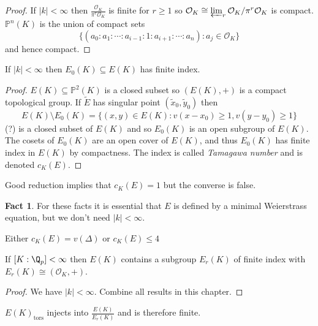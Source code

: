 \documentclass[a4paper]{article}
\theoremstyle{definition}
\newtheorem*{fact}{Fact}
\theoremstyle{theorem}
\renewcommand*{\P}{\mathbb{P}}
\renewcommand*{\O}{\mathcal{O}}
\begin{document}
\begin{proof}
  If \(|k| < \infty\) then \(\frac{\O_K}{\pi^r \O_K}\) is finite for \(r \geq 1\) so \(\O_K \cong \varprojlim_r \O_K/\pi^r \O_K\) is compact. \(\P^n(K)\) is the union of compact sets
  \[
    \{(a_0: a_1: \cdots : a_{i - 1}: 1 : a_{i + 1}: \cdots: a_n): a_j \in \O_K\}
  \]
  and hence compact.
\end{proof}

\begin{lemma}
  If \(|k| < \infty\) then \(E_0(K) \subseteq E(K)\) has finite index.
\end{lemma}

\begin{proof}
  \(E(K) \subseteq \P^2(K)\) is a closed subset so \((E(K), +)\) is a compact topological group. If \(\widetilde E\) has singular point \((\tilde x_0, \tilde y_0)\) then
  \[
    E(K) \setminus E_0(K) = \{(x, y) \in E(K): v(x - x_0) \geq 1, v(y - y_0) \geq 1\}
  \]
  (?) is a closed subset of \(E(K)\) and so \(E_0(K)\) is an open subgroup of \(E(K)\). The cosets of \(E_0(K)\) are an open cover of \(E(K)\), and thus \(E_0(K)\) has finite index in \(E(K)\) by compactness. The index is called \emph{Tamagawa number} and is denoted \(c_K(E)\).
\end{proof}

\begin{remark}
  Good reduction implies that \(c_K(E) = 1\) but the converse is false.
\end{remark}

\begin{fact}
  For these facts it is essential that \(E\) is defined by a minimal Weierstrass equation, but we don't need \(|k| < \infty\).

  Either \(c_K(E) = v(\Delta)\) or \(c_K(E) \leq 4\)
\end{fact}

\begin{theorem}
  If \([K: \Q_p] < \infty\) then \(E(K)\) contains a subgroup \(E_r(K)\) of finite index with \(E_r(K) \cong (\O_K, +)\).
\end{theorem}

\begin{proof}
  We have \(|k| < \infty\). Combine all results in this chapter.
\end{proof}

\begin{corollary}
  \(E(K)_{\mathrm{tors}}\) injects into \(\frac{E(K)}{E_r(K)}\) and is therefore finite.
\end{corollary}
\end{document}
